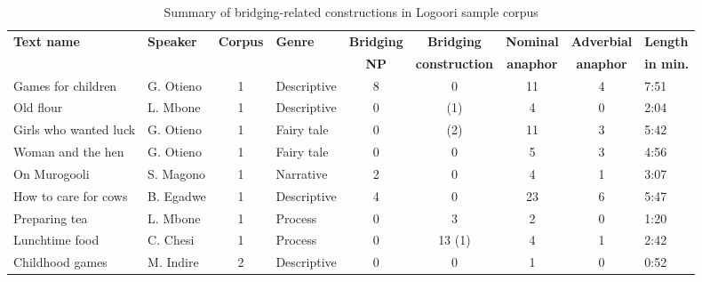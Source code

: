 \documentclass[output=paper]{LSP/langsci}
\begin{document}
\begin{table}
\small
\caption{Summary of bridging-related constructions in Logoori sample corpus}
\label{SaTabl2}
\begin{tabular}{llclccccl}
\lsptoprule
\textbf{Text name}              & \textbf{Speaker} & \textbf{Corpus} & \textbf{Genre} & \textbf{Bridging } & \textbf{Bridging}     & \textbf{Nominal} & \textbf{Adverbial} & \textbf{Length}  \\
\textbf{}                  & \textbf{}        & \textbf{}       & \textbf{}      & \textbf{NP}            & \textbf{construction} & \textbf{anaphor} & \textbf{anaphor}   & \textbf{in min.} \\
\midrule
Games for children         & G. Otieno        & 1         & Descriptive    & 8                    & 0                     & 11               & 4                  & 7:51             \\
Old flour                  & L. Mbone        & 1         & Descriptive    & 0                    & (1)                   & 4                & 0                  & 2:04             \\
Girls who wanted luck      & G. Otieno        & 1         & Fairy tale     & 0                    & (2)                   & 11               & 3                  & 5:42             \\
Woman and the hen          & G. Otieno        & 1         & Fairy tale     & 0                    & 0                     & 5                & 3                  & 4:56             \\
On Murogooli              & S. Magono        & 1         & Narrative      & 2                    & 0                     & 4                & 1                  & 3:07             \\
How to care for cows       & B. Egadwe        & 1         & Descriptive    & 4                    & 0                     & 23               & 6                  & 5:47             \\
Preparing tea              & L. Mbone        & 1         & Process        & 0                    & 3                     & 2                & 0                  & 1:20             \\
Lunchtime food             & C. Chesi         & 1         & Process        & 0                    & 13 (1)                & 4                & 1                  & 2:42             \\
Childhood games            & M. Indire        & 2     & Descriptive    & 0                    & 0                     & 1                & 0                  & 0:52             \\

\end{tabular}
\end{table}
\end{document}
